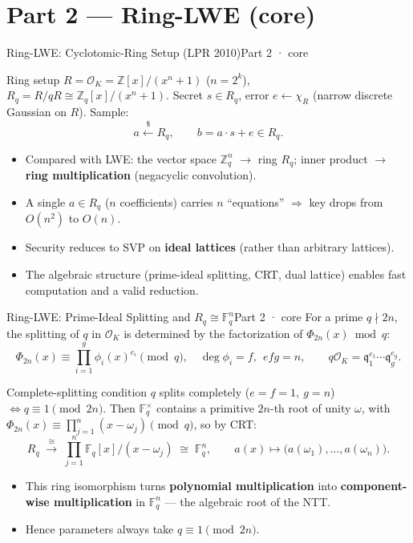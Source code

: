 \documentclass[aspectratio=169, 11pt]{beamer}
\newcommand{\Z}{\mathbb{Z}}
\newcommand{\F}{\mathbb{F}}
\newcommand{\OK}{\mathcal{O}_K}
\begin{document}
\section{Part 2 --- Ring-LWE (core)}

\begin{frame}{Ring-LWE: Cyclotomic-Ring Setup (LPR 2010)}{Part 2 · core}
  \begin{block}{Ring setup}
    $R=\OK=\Z[x]/(x^n+1)$ ($n=2^k$), $R_q=R/qR\cong\Z_q[x]/(x^n+1)$.
    Secret $s\in R_q$, error $e\leftarrow\chi_R$ (narrow discrete Gaussian on $R$). Sample:
    \[
      a \xleftarrow{\$} R_q,\qquad b = a\cdot s + e \in R_q.
    \]
  \end{block}
  \begin{itemize}\small
    \item Compared with LWE: the vector space $\Z_q^n$ $\to$ ring $R_q$; inner product $\to$ \textbf{ring multiplication} (negacyclic convolution).
    \item A single $a\in R_q$ ($n$ coefficients) carries $n$ ``equations'' $\Rightarrow$ key drops from $O(n^2)$ to $O(n)$.
    \item Security reduces to SVP on \textbf{ideal lattices} (rather than arbitrary lattices).
    \item The algebraic structure (prime-ideal splitting, CRT, dual lattice) enables fast computation and a valid reduction.
  \end{itemize}
\end{frame}

\begin{frame}{Ring-LWE: Prime-Ideal Splitting and $R_q\cong\F_q^n$}{Part 2 · core}
  For a prime $q\nmid 2n$, the splitting of $q$ in $\OK$ is determined by the factorization of $\Phi_{2n}(x)\bmod q$:
  \[
    \Phi_{2n}(x)\equiv\prod_{i=1}^{g}\phi_i(x)^{e_i}\!\!\pmod q,\quad \deg\phi_i=f,\ \ efg=n,
    \qquad q\OK=\mathfrak{q}_1^{e_1}\cdots\mathfrak{q}_g^{e_g}.
  \]
  \begin{block}{Complete-splitting condition}
    $q$ splits completely ($e=f=1,\ g=n$) $\iff q\equiv1\pmod{2n}$.
    Then $\F_q^\times$ contains a primitive $2n$-th root of unity $\omega$, with
    $\Phi_{2n}(x)\equiv\prod_{j=1}^n(x-\omega_j)\pmod q$, so by CRT:
    \[
      R_q\;\xrightarrow{\ \cong\ }\;\prod_{j=1}^n \F_q[x]/(x-\omega_j)\;\cong\;\F_q^n,
      \qquad a(x)\mapsto\bigl(a(\omega_1),\dots,a(\omega_n)\bigr).
    \]
  \end{block}
  \begin{itemize}\small
    \item This ring isomorphism turns \textbf{polynomial multiplication} into \textbf{component-wise multiplication} in $\F_q^n$ --- the algebraic root of the NTT.
    \item Hence parameters always take $q\equiv1\pmod{2n}$.
  \end{itemize}
\end{frame}
\end{document}
